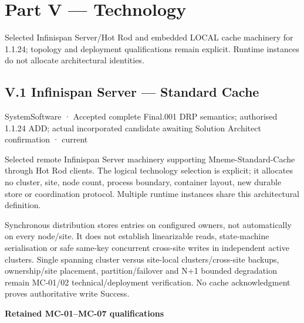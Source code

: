 \part*{Part V — Technology}
\label{navigation:V}
Selected Infinispan Server/Hot Rod and embedded LOCAL cache machinery for 1.1.24; topology and deployment qualifications remain explicit. Runtime instances do not allocate architectural identities.\par
\chapter*{V.1 Infinispan Server — Standard Cache}
\label{navigation:V.1}

\label{element:c2b216d461b24d659c202268f0ec7fb7}
{\small SystemSoftware · Accepted complete Final.001 DRP semantics; authorised 1.1.24 ADD; actual incorporated candidate awaiting Solution Architect confirmation · current}\par

Selected remote Infinispan Server machinery supporting Mneme-Standard-Cache through Hot Rod clients. The logical technology selection is explicit; it allocates no cluster, site, node count, process boundary, container layout, new durable store or coordination protocol. Multiple runtime instances share this architectural definition.



Synchronous distribution stores entries on configured owners, not automatically on every node/site. It does not establish linearizable reads, state-machine serialisation or safe same-key concurrent cross-site writes in independent active clusters. Single spanning cluster versus site-local clusters/cross-site backups, ownership/site placement, partition/failover and N+1 bounded degradation remain MC-01/02 technical/deployment verification. No cache acknowledgment proves authoritative write Success.



\par\medskip\textbf{Retained MC-01–MC-07 qualifications}\par


